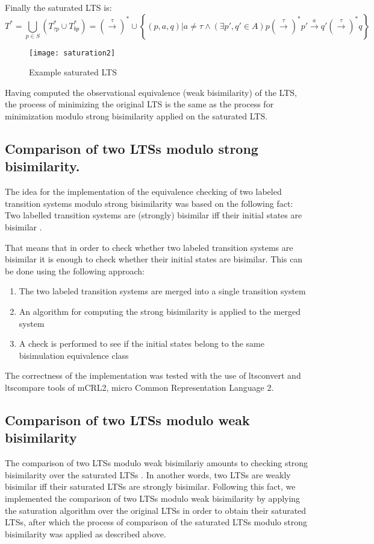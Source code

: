 Finally the saturated LTS is:
\begin{equation*}
	T^{*}=\bigcup_{p\in S}\left(T^{*}_{\tau p}\cup T^{*}_{bp}\right)=\left(\stackrel{\tau}{\rightarrow}\right)^{*}\cup\left\{\left(p,a,q\right)|a\neq\tau\wedge\left(\exists p',q'\in A\right) p\left(\stackrel{\tau}{\rightarrow}\right)^{*}p'\stackrel{a}{\rightarrow}q'\left(\stackrel{\tau}{\rightarrow}\right)^{*}q\right\}
\end{equation*}

\begin{figure}[!ht]
\centering
\texttt{[image: saturation2]}
\caption{Example saturated LTS}
\label{fig:saturation2}
\end{figure}

Having computed the observational equivalence (weak bisimilarity) of the LTS, the process of minimizing the original LTS is the same as the process for minimization modulo strong bisimilarity applied on the saturated LTS.

\subsection{Comparison of two LTSs modulo strong bisimilarity.}
The idea for the implementation of the equivalence checking of two labeled transition systems modulo strong bisimilarity was based on the following fact: Two labelled transition systems are (strongly) bisimilar iff their initial states are bisimilar \cite{ModellingAndAnalysis}.

That means that in order to check whether two labeled transition systems are bisimilar it is enough to check whether their initial states are bisimilar. This can be done using the following approach:
\begin{enumerate}
	\item The two labeled transition systems are merged into a single transition system
	\item An algorithm for computing the strong bisimilarity is applied to the merged system
	\item A check is performed to see if the initial states belong to the same bisimulation equivalence class
\end{enumerate}

The correctness of the implementation was tested with the use of ltsconvert and ltscompare tools of mCRL2, micro Common Representation Language 2.

\subsection{Comparison of two LTSs modulo weak bisimilarity}
The comparison of two LTSs modulo weak bisimilariy amounts to checking strong bisimilarity over the saturated LTSs \cite{ReactiveSystems}. In another words, two LTSs are weakly bisimilar iff their saturated LTSs are strongly bisimilar. Following this fact, we implemented the comparison of two LTSs modulo weak bisimilarity by applying the saturation algorithm over the original LTSs in order to obtain their saturated LTSs, after which the process of comparison of the saturated LTSs modulo strong bisimilarity was applied as described above.